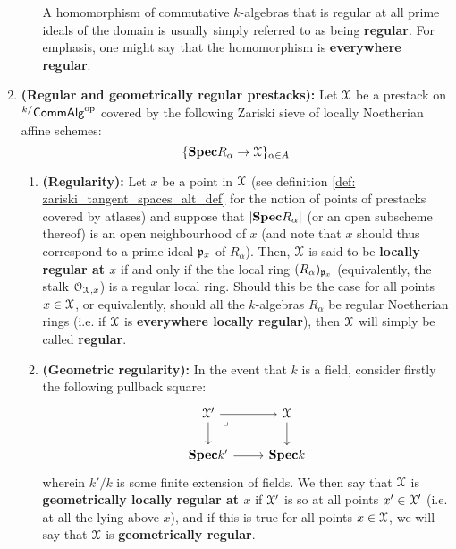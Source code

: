 \begin{definition}[Regularity]
\begin{enumerate}
\begin{enumerate}
                                A homomorphism of commutative $k$-algebras that is regular at all prime ideals of the domain is usually simply referred to as being \textbf{regular}. For emphasis, one might say that the homomorphism is \textbf{everywhere regular}.
                            \end{enumerate}
                        \item \textbf{(Regular and geometrically regular prestacks):} Let $\mathcal{X}$ be a prestack on ${}^{k/}\mathsf{Comm}\mathsf{Alg}^{\mathrm{op}}$ covered by the following Zariski sieve of locally Noetherian affine schemes:
                            $$\{\mathbf{Spec} R_{\alpha} \to \mathcal{X}\}_{\alpha \in A}$$
                            \begin{enumerate}
                                \item \textbf{(Regularity):} Let $x$ be a point in $\mathcal{X}$ (see definition \ref{def: zariski_tangent_spaces_alt_def} for the notion of points of prestacks covered by atlases) and suppose that $|\mathbf{Spec} R_{\alpha}|$ (or an open subscheme thereof) is an open neighbourhood of $x$ (and note that $x$ should thus correspond to a prime ideal $\mathfrak{p}_x$ of $R_{\alpha}$). Then, $\mathcal{X}$ is said to be \textbf{locally regular at $x$} if and only if the the local ring $(R_{\alpha})_{\mathfrak{p}_x}$ (equivalently, the stalk $\mathcal{O}_{\mathcal{X}, x}$) is a regular local ring. Should this be the case for all points $x \in \mathcal{X}$, or equivalently, should all the $k$-algebras $R_{\alpha}$ be regular Noetherian rings (i.e. if $\mathcal{X}$ is \textbf{everywhere locally regular}), then $\mathcal{X}$ will simply be called \textbf{regular}. 
                                \item \textbf{(Geometric regularity):} In the event that $k$ is a field, consider firstly the following pullback square:
                                    $$
                                        \begin{tikzcd}
                                        	{\calX'} & \calX \\
                                        	{\Spec k'} & {\Spec k}
                                        	\arrow[from=1-1, to=2-1]
                                        	\arrow[from=2-1, to=2-2]
                                        	\arrow[from=1-1, to=1-2]
                                        	\arrow[from=1-2, to=2-2]
                                        	\arrow["\lrcorner"{anchor=center, pos=0.125}, draw=none, from=1-1, to=2-2]
                                        \end{tikzcd}
                                    $$
                                wherein $k'/k$ is some finite extension of fields. We then say that $\mathcal{X}$ is \textbf{geometrically locally regular at $x$} if $\mathcal{X}'$ is so at all points $x' \in \mathcal{X}'$ (i.e. at all the  lying above $x$), and if this is true for all points $x \in \mathcal{X}$, we will say that $\mathcal{X}$ is \textbf{geometrically regular}.
                            \end{enumerate}
                    \end{enumerate}
                \end{definition}
